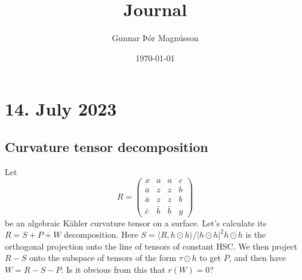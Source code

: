 \documentclass[11pt]{article}
\author{Gunnar Þór Magnússon}
\date{\today}
\title{Journal}
\theoremstyle{definition}
\def\<{\langle}
\def\>{\rangle}
\begin{document}
\maketitle

\section{14. July 2023}

\subsection*{Curvature tensor decomposition}

Let
$$
R = \begin{pmatrix}
x & a & a & c
\\
\bar a & z & z & b
\\
\bar a & z & z & b
\\
\bar c & \bar b & \bar b & y
\end{pmatrix}
$$
be an algebraic K\"ahler curvature tensor on a surface.
Let's calculate its $R = S + P + W$ decomposition.
Here $S = \<R, h \odot h \> / |h \odot h|^2 h \odot h$ is the orthogonal
projection onto the line of tensors of constant HSC.
We then project $R - S$ onto the subspace of tensors of the form $\tau \odot h$
to get $P$, and then have $W = R - S - P$.
Is it obvious from this that $r(W) = 0$?
\end{document}
